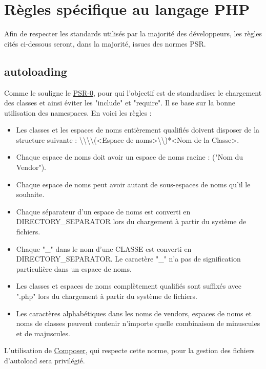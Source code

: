 
\section{Règles spécifique au langage PHP}
Afin de respecter les standards utilisés par la majorité des développeurs, les règles cités ci-dessous seront, dans la majorité, issues des normes PSR.

\subsection{autoloading}
Comme le souligne le \href{http://www.php-fig.org/psr/psr-0/}{PSR-0}, pour qui l'objectif est de standardiser le chargement des classes et ainsi éviter les "include" et "require". Il se base sur la bonne utilisation des namespaces. En voici les règles :
\begin{itemize}[label=\textbullet]
  \item Les classes et les espaces de noms entièrement qualifiés doivent disposer de la structure suivante : \textbackslash\textbackslash<Nom du Vendor>\textbackslash\textbackslash(<Espace de noms>\textbackslash\textbackslash)*<Nom de la Classe>.
  \item Chaque espace de noms doit avoir un espace de noms racine : ("Nom du Vendor").
  \item Chaque espace de noms peut avoir autant de sous-espaces de noms qu'il le souhaite.
  \item Chaque séparateur d'un espace de noms est converti en DIRECTORY\_SEPARATOR lors du chargement à partir du système de fichiers.
  \item Chaque "\_" dans le nom d'une CLASSE est converti en DIRECTORY\_SEPARATOR. Le caractère "\_" n'a pas de signification particulière dans un espace de noms.
  \item Les classes et espaces de noms complètement qualifiés sont suffixés avec ".php" lors du chargement à partir du système de fichiers.
  \item Les caractères alphabétiques dans les noms de vendors, espaces de noms et noms de classes peuvent contenir n'importe quelle combinaison de minuscules et de majuscules.
\end{itemize}

L'utilisation de \href{https://getcomposer.org/}{Composer}, qui respecte cette norme, pour la gestion des fichiers d'autoload sera privilégié.

